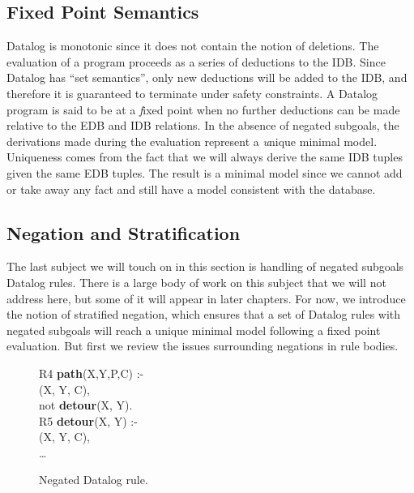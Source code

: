 \subsection{Fixed Point Semantics}

Datalog is monotonic since it does not contain the notion of deletions.  The
evaluation of a program proceeds as a series of deductions to the IDB.  Since
Datalog has ``set semantics'', only new deductions will be added to the IDB,
and therefore it is guaranteed to terminate under safety constraints.  A
Datalog program is said to be at a {\emph fixed point} when no further
deductions can be made relative to the EDB and IDB relations.  In the absence
of negated subgoals, the derivations made during the evaluation represent a
{\emph unique minimal model}.  Uniqueness comes from the fact that we will
always derive the same IDB tuples given the same EDB tuples.  The result is a
minimal model since we cannot add or take away any fact and still have a model
consistent with the database.

\subsection{Negation and Stratification}

The last subject we will touch on in this section is handling of negated
subgoals Datalog rules.  There is a large body of work on this subject that we
will not address here, but some of it will appear in later chapters.  For now,
we introduce the notion of stratified negation, which ensures that a set of
Datalog rules with negated subgoals will reach a unique minimal model following
a fixed point evaluation.  But first we review the issues surrounding negations
in rule bodies.

\begin{figure}
\centering
\ssp
\begin{boxedminipage}{\linewidth}
R4 {\bf path}(X,Y,P,C) :- \\
(X, Y, C), \\
\datalogspace not {\bf detour}(X, Y). \\

R5 {\bf detour}(X, Y) :- \\
(X, Y, C), \\
\datalogspace \ldots 
\end{boxedminipage}
\caption{\label{ch:p2:fig:negation}Negated Datalog rule.}
\end{figure}


